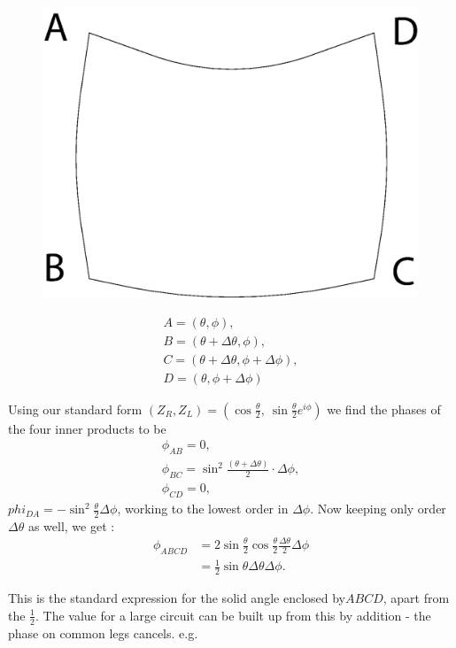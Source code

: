 \begin{figure}[H]
\centering
\includegraphics[scale=0.16]{src/images/chap26/12.jpg}
\end{figure}
\begin{gather*}
A = (\theta, \phi),\\
B = (\theta + \Delta \theta, \phi),\\
C = (\theta + \Delta \theta, \phi + \Delta \phi),\\
D = (\theta, \phi + \Delta \phi)
\end{gather*}

Using our standard form $(Z_R , Z_L ) = (\cos \frac{\theta}{2}, ~ \sin \frac{\theta}{2} e^{i\phi})$ we find the phases
of the four inner products to be
\begin{gather*}
\phi_{AB} = 0,\\
\phi_{BC} = \sin^2 \frac{(\theta + \Delta \theta)}{2} \cdot \Delta \phi,\\
\phi_{CD} = 0,
\end{gather*}
$phi_{DA} = -\sin^2 \frac{\theta}{2} \Delta \phi$, working to the lowest order in $\Delta \phi$. 
Now keeping only order $\Delta \theta$ as well, we get :
\begin{align*}
\phi_{ABCD} &= 2 \sin \frac{\theta}{2} \cos \frac{\theta}{2} \frac{\Delta \theta }{2} \Delta \phi\\
&= \frac{1}{2} \sin \theta \Delta \theta \Delta \phi.
\end{align*}

This is the standard expression for the solid angle enclosed by\break $ABCD$, apart
from the $\frac{1}{2}$. The value for a large circuit can be built up from this by addition -
the phase on common legs cancels. e.g.
\bigskip

